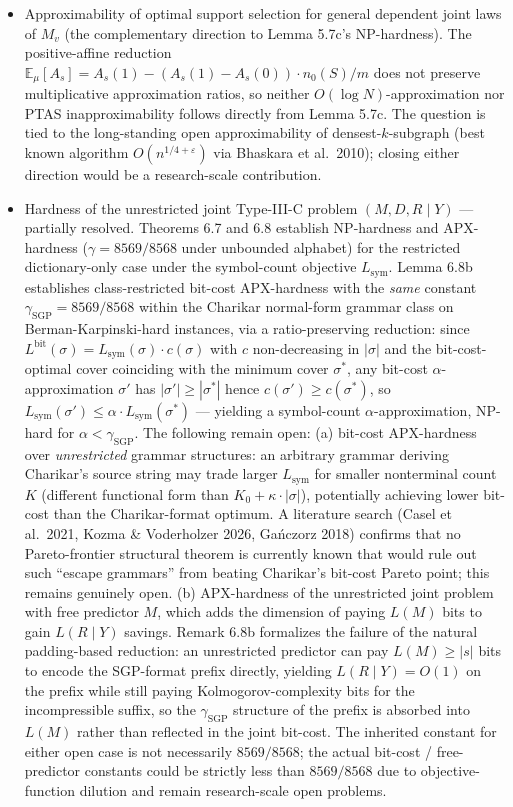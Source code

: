 \documentclass[
]{article}
\begin{document}
\begin{itemize}
\item
  Approximability of optimal support selection for general
  dependent joint laws of $M_v$ (the complementary direction to
  Lemma 5.7c's NP-hardness). The positive-affine reduction
  $\mathbb{E}_\mu[A_s] = A_s(1) - (A_s(1) - A_s(0)) \cdot n_0(S)/m$
  does not preserve multiplicative approximation ratios, so neither
  $O(\log N)$-approximation nor PTAS inapproximability follows
  directly from Lemma 5.7c. The question is tied to the
  long-standing open approximability of densest-$k$-subgraph (best
  known algorithm $O(n^{1/4+\varepsilon})$ via Bhaskara et al.\
  2010); closing either direction would be a research-scale
  contribution.
\item
  Hardness of the unrestricted joint Type-III-C problem
  $(M, D, R \mid Y)$ --- partially resolved. Theorems 6.7 and 6.8
  establish NP-hardness and APX-hardness ($\gamma = 8569/8568$ under
  unbounded alphabet) for the restricted dictionary-only case under
  the symbol-count objective $L_{\mathrm{sym}}$. Lemma 6.8b
  establishes class-restricted bit-cost APX-hardness with the
  \emph{same} constant $\gamma_{\mathrm{SGP}} = 8569/8568$ within the
  Charikar normal-form grammar class on Berman-Karpinski-hard
  instances, via a ratio-preserving reduction: since
  $L^{\mathrm{bit}}(\sigma) = L_{\mathrm{sym}}(\sigma) \cdot c(\sigma)$
  with $c$ non-decreasing in $|\sigma|$ and the bit-cost-optimal cover
  coinciding with the minimum cover $\sigma^*$, any bit-cost
  $\alpha$-approximation $\sigma'$ has $|\sigma'| \geq |\sigma^*|$
  hence $c(\sigma') \geq c(\sigma^*)$, so $L_{\mathrm{sym}}(\sigma')
  \leq \alpha \cdot L_{\mathrm{sym}}(\sigma^*)$ — yielding a
  symbol-count $\alpha$-approximation, NP-hard for $\alpha <
  \gamma_{\mathrm{SGP}}$. The following remain open:
  (a) bit-cost APX-hardness over \emph{unrestricted} grammar
  structures: an arbitrary grammar deriving Charikar's source string
  may trade larger $L_{\mathrm{sym}}$ for smaller nonterminal count
  $K$ (different functional form than $K_0 + \kappa \cdot |\sigma|$),
  potentially achieving lower bit-cost than the Charikar-format optimum.
  A literature search (Casel et al.\ 2021, Kozma \&
  Voderholzer 2026, Ga\'nczorz 2018) confirms that no
  Pareto-frontier structural theorem is currently known that would
  rule out such ``escape grammars'' from beating Charikar's bit-cost
  Pareto point; this remains genuinely open. (b) APX-hardness of the
  unrestricted joint
  problem with free predictor $M$, which adds the dimension of paying
  $L(M)$ bits to gain $L(R \mid Y)$
  savings. Remark 6.8b formalizes the failure of the
  natural padding-based reduction: an unrestricted predictor can
  pay $L(M) \geq |s|$ bits to encode the SGP-format prefix directly,
  yielding $L(R \mid Y) = O(1)$ on the prefix while still paying
  Kolmogorov-complexity bits for the incompressible suffix, so the
  $\gamma_{\mathrm{SGP}}$ structure of the prefix is absorbed into
  $L(M)$ rather than reflected in the joint bit-cost. The inherited constant
  for either open case is not necessarily $8569/8568$; the actual
  bit-cost / free-predictor constants could be strictly less than
  $8569/8568$ due to objective-function dilution and remain
  research-scale open problems.


\end{itemize}
\end{document}
